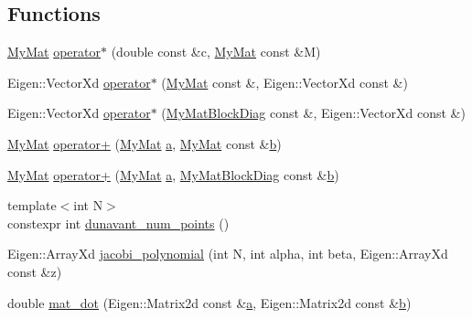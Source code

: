 \subsection*{Functions}
\begin{DoxyCompactItemize}
\item 
\hyperlink{classTspeed_1_1MyMat}{My\-Mat} \hyperlink{namespaceTspeed_ae052fa580f4cab9151f68a690e8d5bca}{operator$\ast$} (double const \&c, \hyperlink{classTspeed_1_1MyMat}{My\-Mat} const \&M)
\item 
Eigen\-::\-Vector\-Xd \hyperlink{namespaceTspeed_a47058bd8c3ef387978ab2b5c81038632}{operator$\ast$} (\hyperlink{classTspeed_1_1MyMat}{My\-Mat} const \&, Eigen\-::\-Vector\-Xd const \&)
\item 
Eigen\-::\-Vector\-Xd \hyperlink{namespaceTspeed_a709169815b0e02183d3c4d5b581e735f}{operator$\ast$} (\hyperlink{classTspeed_1_1MyMatBlockDiag}{My\-Mat\-Block\-Diag} const \&, Eigen\-::\-Vector\-Xd const \&)
\item 
\hyperlink{classTspeed_1_1MyMat}{My\-Mat} \hyperlink{namespaceTspeed_ab8df12f3c804c527b4d9006350d50c62}{operator+} (\hyperlink{classTspeed_1_1MyMat}{My\-Mat} \hyperlink{load__and__plot__lamb_8m_aa875ab3a8009406dcace7fa71a0f490d}{a}, \hyperlink{classTspeed_1_1MyMat}{My\-Mat} const \&\hyperlink{load__and__plot__lamb_8m_a21c7e548e910bb7ce7dcea81de72c8f7}{b})
\item 
\hyperlink{classTspeed_1_1MyMat}{My\-Mat} \hyperlink{namespaceTspeed_a1f4d38ebd3223a0e5ea8cfad29fcc10c}{operator+} (\hyperlink{classTspeed_1_1MyMat}{My\-Mat} \hyperlink{load__and__plot__lamb_8m_aa875ab3a8009406dcace7fa71a0f490d}{a}, \hyperlink{classTspeed_1_1MyMatBlockDiag}{My\-Mat\-Block\-Diag} const \&\hyperlink{load__and__plot__lamb_8m_a21c7e548e910bb7ce7dcea81de72c8f7}{b})
\item 
{\footnotesize template$<$int N$>$ }\\constexpr int \hyperlink{namespaceTspeed_abe613e0b4c7defa00ceffeca9747e2a6}{dunavant\-\_\-num\-\_\-points} ()
\item 
Eigen\-::\-Array\-Xd \hyperlink{namespaceTspeed_a9ba8173dee16becd9ff4f59553c2d042}{jacobi\-\_\-polynomial} (int N, int alpha, int beta, Eigen\-::\-Array\-Xd const \&z)
\item 
double \hyperlink{namespaceTspeed_a6a29478b3e21b48d3017dab2e3b10291}{mat\-\_\-dot} (Eigen\-::\-Matrix2d const \&\hyperlink{load__and__plot__lamb_8m_aa875ab3a8009406dcace7fa71a0f490d}{a}, Eigen\-::\-Matrix2d const \&\hyperlink{load__and__plot__lamb_8m_a21c7e548e910bb7ce7dcea81de72c8f7}{b})
\item 

\end{DoxyCompactItemize}
